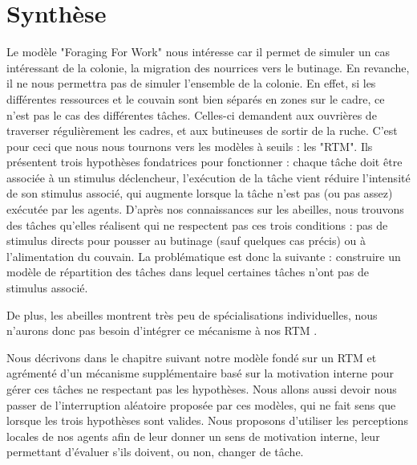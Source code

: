 			
	\section*{Synthèse}
	Le modèle "Foraging For Work" nous intéresse car il permet de simuler un cas intéressant de la colonie, la migration des nourrices vers le butinage. En revanche, il ne nous permettra pas de simuler l'ensemble de la colonie. En effet, si les différentes ressources et le couvain sont bien séparés en zones sur le cadre, ce n'est pas le cas des différentes tâches. Celles-ci demandent aux ouvrières de traverser régulièrement les cadres, et aux butineuses de sortir de la ruche. C'est pour ceci que nous nous tournons vers les modèles à seuils : les "RTM". Ils présentent trois hypothèses fondatrices pour fonctionner : chaque tâche doit être associée à un stimulus déclencheur, l'exécution de la tâche vient réduire l'intensité de son stimulus associé, qui augmente lorsque la tâche n'est pas (ou pas assez) exécutée par les agents.
	D'après nos connaissances sur les abeilles, nous trouvons des tâches qu'elles réalisent qui ne respectent pas ces trois conditions : pas de stimulus directs pour pousser au butinage (sauf quelques cas précis) ou à l'alimentation du couvain. La problématique est donc la suivante : construire un modèle de répartition des tâches dans lequel certaines tâches n'ont pas de stimulus associé.
	
	De plus, les abeilles montrent très peu de spécialisations individuelles, nous n'aurons donc pas besoin d'intégrer ce mécanisme à nos RTM \cite{kolmes_quantitative_1984}.
	
	 Nous décrivons dans le chapitre suivant notre modèle fondé sur un RTM et agrémenté d'un mécanisme supplémentaire basé sur la motivation interne pour gérer ces tâches ne respectant pas les hypothèses. Nous allons aussi devoir nous passer de l'interruption aléatoire proposée par ces modèles, qui ne fait sens que lorsque les trois hypothèses sont valides. Nous proposons d'utiliser les perceptions locales de nos agents afin de leur donner un sens de motivation interne, leur permettant d'évaluer s'ils doivent, ou non, changer de tâche.

